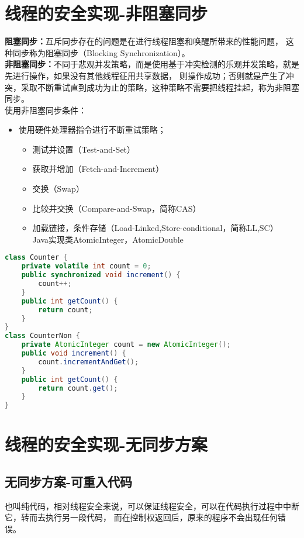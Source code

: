\section{线程的安全实现-非阻塞同步}
\noindent \textbf{阻塞同步：}互斥同步存在的问题是在进行线程阻塞和唤醒所带来的性能问题，
这种同步称为阻塞同步（Blocking Synchronization）。
\\ \textbf{非阻塞同步：}不同于悲观并发策略，而是使用基于冲突检测的乐观并发策略，就是先进行操作，如果没有其他线程征用共享数据，
则操作成功；否则就是产生了冲突，采取不断重试直到成功为止的策略，这种策略不需要把线程挂起，称为非阻塞同步。
\\ 使用非阻塞同步条件：
\begin{itemize}
	\item 使用硬件处理器指令进行不断重试策略；
	\begin{itemize}
		\item 测试并设置（Test-and-Set）
		\item 获取并增加（Fetch-and-Increment）
		\item 交换（Swap）
		\item 比较并交换（Compare-and-Swap，简称CAS）
		\item 加载链接，条件存储（Load-Linked,Store-conditional，简称LL,SC）
		\\Java实现类AtomicInteger，AtomicDouble
	\end{itemize}
\end{itemize}
\begin{lstlisting}[language=java]
class Counter {
	private volatile int count = 0;
	public synchronized void increment() {
		count++;
	}
	public int getCount() {
		return count;
	}
}
class CounterNon {
	private AtomicInteger count = new AtomicInteger();
	public void increment() {
		count.incrementAndGet();
	}
	public int getCount() {
		return count.get();
	}
}
\end{lstlisting}
\section{线程的安全实现-无同步方案}
\subsection{无同步方案-可重入代码}
也叫纯代码，相对线程安全来说，可以保证线程安全，可以在代码执行过程中中断它，转而去执行另一段代码，
而在控制权返回后，原来的程序不会出现任何错误。
